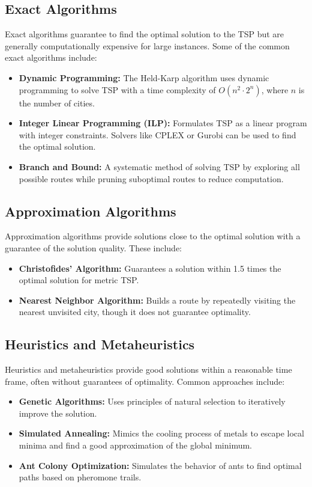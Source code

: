 \documentclass[a4paper]{article}
\begin{document}
\subsection{Exact Algorithms}
Exact algorithms guarantee to find the optimal solution to the TSP but are generally computationally expensive for large instances. Some of the common exact algorithms include:
\begin{itemize}
    \item \textbf{Dynamic Programming:} The Held-Karp algorithm uses dynamic programming to solve TSP with a time complexity of \(O(n^2 \cdot 2^n)\), where \(n\) is the number of cities.
    \item \textbf{Integer Linear Programming (ILP):} Formulates TSP as a linear program with integer constraints. Solvers like CPLEX or Gurobi can be used to find the optimal solution.
    \item \textbf{Branch and Bound:} A systematic method of solving TSP by exploring all possible routes while pruning suboptimal routes to reduce computation.
\end{itemize}

\subsection{Approximation Algorithms}
Approximation algorithms provide solutions close to the optimal solution with a guarantee of the solution quality. These include:
\begin{itemize}
    \item \textbf{Christofides' Algorithm:} Guarantees a solution within 1.5 times the optimal solution for metric TSP.
    \item \textbf{Nearest Neighbor Algorithm:} Builds a route by repeatedly visiting the nearest unvisited city, though it does not guarantee optimality.
\end{itemize}

\subsection{Heuristics and Metaheuristics}
Heuristics and metaheuristics provide good solutions within a reasonable time frame, often without guarantees of optimality. Common approaches include:
\begin{itemize}
    \item \textbf{Genetic Algorithms:} Uses principles of natural selection to iteratively improve the solution.
    \item \textbf{Simulated Annealing:} Mimics the cooling process of metals to escape local minima and find a good approximation of the global minimum.
    \item \textbf{Ant Colony Optimization:} Simulates the behavior of ants to find optimal paths based on pheromone trails.
\end{itemize}
\end{document}
